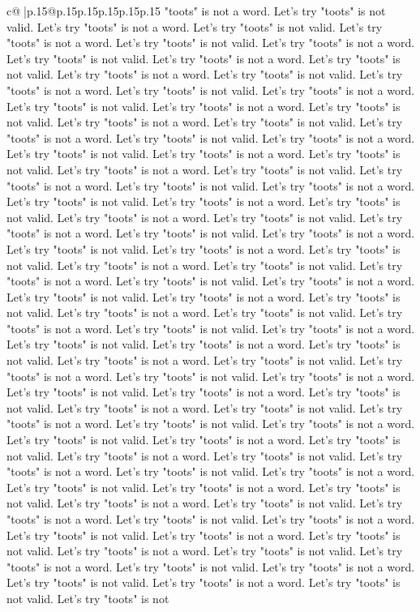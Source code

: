 \documentclass{article}
\begin{document}
{\begin{supertabular}{c@{$\;$}|p{.15\linewidth}@{}p{.15\linewidth}p{.15\linewidth}p{.15\linewidth}p{.15\linewidth}p{.15\linewidth}}
{{{"toots" is not a word. Let's try "toots" is not valid. Let's try "toots" is not a word. Let's try "toots" is not valid. Let's try "toots" is not a word. Let's try "toots" is not valid. Let's try "toots" is not a word. Let's try "toots" is not valid. Let's try "toots" is not a word. Let's try "toots" is not valid. Let's try "toots" is not a word. Let's try "toots" is not valid. Let's try "toots" is not a word. Let's try "toots" is not valid. Let's try "toots" is not a word. Let's try "toots" is not valid. Let's try "toots" is not a word. Let's try "toots" is not valid. Let's try "toots" is not a word. Let's try "toots" is not valid. Let's try "toots" is not a word. Let's try "toots" is not valid. Let's try "toots" is not a word. Let's try "toots" is not valid. Let's try "toots" is not a word. Let's try "toots" is not valid. Let's try "toots" is not a word. Let's try "toots" is not valid. Let's try "toots" is not a word. Let's try "toots" is not valid. Let's try "toots" is not a word. Let's try "toots" is not valid. Let's try "toots" is not a word. Let's try "toots" is not valid. Let's try "toots" is not a word. Let's try "toots" is not valid. Let's try "toots" is not a word. Let's try "toots" is not valid. Let's try "toots" is not a word. Let's try "toots" is not valid. Let's try "toots" is not a word. Let's try "toots" is not valid. Let's try "toots" is not a word. Let's try "toots" is not valid. Let's try "toots" is not a word. Let's try "toots" is not valid. Let's try "toots" is not a word. Let's try "toots" is not valid. Let's try "toots" is not a word. Let's try "toots" is not valid. Let's try "toots" is not a word. Let's try "toots" is not valid. Let's try "toots" is not a word. Let's try "toots" is not valid. Let's try "toots" is not a word. Let's try "toots" is not valid. Let's try "toots" is not a word. Let's try "toots" is not valid. Let's try "toots" is not a word. Let's try "toots" is not valid. Let's try "toots" is not a word. Let's try "toots" is not valid. Let's try "toots" is not a word. Let's try "toots" is not valid. Let's try "toots" is not a word. Let's try "toots" is not valid. Let's try "toots" is not a word. Let's try "toots" is not valid. Let's try "toots" is not a word. Let's try "toots" is not valid. Let's try "toots" is not a word. Let's try "toots" is not valid. Let's try "toots" is not a word. Let's try "toots" is not valid. Let's try "toots" is not a word. Let's try "toots" is not valid. Let's try "toots" is not a word. Let's try "toots" is not valid. Let's try "toots" is not a word. Let's try "toots" is not valid. Let's try "toots" is not a word. Let's try "toots" is not valid. Let's try "toots" is not a word. Let's try "toots" is not valid. Let's try "toots" is not a word. Let's try "toots" is not valid. Let's try "toots" is not a word. Let's try "toots" is not valid. Let's try "toots" is not a word. Let's try "toots" is not valid. Let's try "toots" is not a word. Let's try "toots" is not valid. Let's try "toots" is not a word. Let's try "toots" is not valid. Let's try "toots" is not a word. Let's try "toots" is not valid. Let's try "toots" is not a word. Let's try "toots" is not valid. Let's try "toots" is not }}}
\end{supertabular}}
\end{document}
